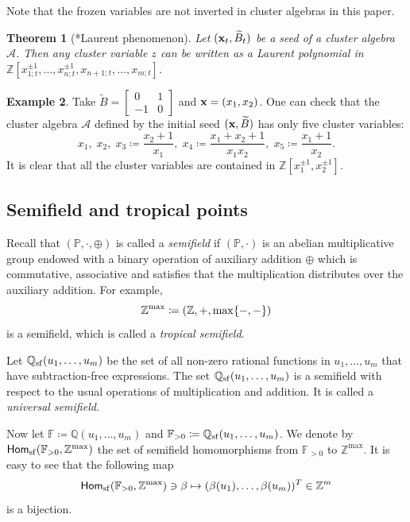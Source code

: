\documentclass[12pt]{amsart}
\newtheorem{theorem}{Theorem}[section]
\theoremstyle{definition}
\newtheorem{example}[theorem]{Example}
\theoremstyle{remark}
\numberwithin{equation}{section}
\def\QQ{\mathbb{Q}}
\newcommand{\opname}[1]{\operatorname{\mathsf{#1}}}
\newcommand{\Hom}{\opname{Hom}}
\begin{document}
Note that the frozen variables are not inverted in cluster algebras in this paper.



\begin{theorem}[{\cite{fz_2002}*{Laurent phenomenon}}] Let $({\bf x}_t,\widetilde B_t)$ be a seed of a cluster algebra $\mathcal A$. Then any cluster variable $z$ can be written as a Laurent polynomial in $\mathbb Z[x_{1;t}^{\pm 1}, \ldots, x_{n;t}^{\pm 1},x_{n+1;t},\ldots,x_{m;t}]$.
\end{theorem}



\begin{example}\label{ex:A2}
   Take $\widetilde B=\begin{bmatrix}
    0&1\\-1&0
\end{bmatrix}$ and ${\bf x}=(x_1,x_2)$. One can check that the  cluster algebra $\mathcal A$ defined by the initial seed $({\bf x},\widetilde B)$  has only five cluster variables:
\[x_1, \;x_2, \;x_3 \coloneqq   \frac{x_2+1}{x_1}, \;x_4 \coloneqq   \frac{x_1+x_2+1}{x_1x_2}, \;x_5 \coloneqq   \frac{x_1+1}{x_2}.\]
It is clear that all the cluster variables are contained in $\mathbb Z[x_1^{\pm 1},x_2^{\pm 1}]$.
\end{example}


\subsection{Semifield and tropical points}
Recall that $(\mathbb P, \cdot, \oplus)$ is called a {\em semifield} if $(\mathbb P,  \cdot)$ is an abelian multiplicative group endowed with a binary operation of auxiliary addition $\oplus$ which is commutative, associative and satisfies that the multiplication  distributes over the auxiliary addition. For example, $$\mathbb Z^{\rm max} \coloneqq   (\mathbb Z,+, \max\{-,-\})$$ 
is a semifield, which is called a {\em tropical semifield}.



Let $\QQ_{\rm sf}(u_1, \ldots, u_m)$ be the
set of all non-zero rational functions in $u_1, \ldots, u_m$ that have subtraction-free expressions. The set $\QQ_{\rm sf}(u_1, \ldots, u_m)$  is a semifield
with respect to the usual operations of multiplication and addition. It is called a {\em universal semifield}.

Now let $\mathbb F \coloneqq   \mathbb Q(u_1,\ldots,u_m)$ and $\mathbb F_{>0} \coloneqq   \QQ_{\rm sf}(u_1, \ldots, u_m)$. We denote by
$\Hom_{\rm sf}(\mathbb  F_{>0},\mathbb Z^{\max})$ the set of semifield homomorphisms from $\mathbb F_{>0}$ to $\mathbb Z^{\max}$. It is easy to see that the following map \[\Hom_{\rm sf}(\mathbb  F_{>0},\mathbb Z^{\max})\ni \beta\mapsto (\beta(u_1),\ldots,\beta(u_m))^T\in\mathbb Z^m\] is a bijection.
\end{document}
